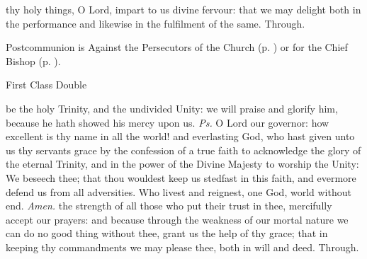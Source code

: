 \postcommunion
{} thy holy things, O Lord, impart to us divine fervour: that we may delight both in the performance and likewise in the fulfilment of the same. Through.
\begin{rubric}
     Postcommunion is Against the Persecutors of the Church (p. \pageref{SPAgainst}) or for the Chief Bishop (p. \pageref{SPChiefBishop}).
\end{rubric}


\begin{inhead}
    {First Class Double}
\end{inhead}
\fancyhead[RE,LO]{}
\par\noindent
{}



\properantiphonfix

\introit
{} be the holy Trinity, and the undivided Unity: we will praise and glorify him, because he hath showed his mercy upon us. \textit{Ps.} O Lord our governor: how excellent is thy name in all the world!
\collect
{} and everlasting God, who hast given unto us thy servants grace by the confession of a true faith to acknowledge the glory of the eternal Trinity, and in the power of the Divine Majesty to worship the Unity: We beseech thee; that thou wouldest keep us stedfast in this faith, and evermore defend us from all adversities. Who livest and reignest, one God, world without end. \textit{Amen.}
 the strength of all those who put their trust in thee, mercifully accept our prayers: and because through the weakness of our mortal nature we can do no good thing without thee, grant us the help of thy grace; that in keeping thy commandments we may please thee, both in will and deed. Through.

